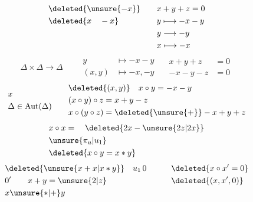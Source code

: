\[
\begin{aligned}
 &\deleted{\unsure{-x}}\quad &&x+y+z=0\\
 &\deleted{x\quad -x}&&y\longmapsto-x-y\\
 &&&y\longrightarrow-y\\
 &&&x\longmapsto-x
\end{aligned}
\]
\[
 \Delta\times \Delta\longrightarrow \Delta\qquad
 \begin{aligned}
 y&\longmapsto-x-y\\
 (x,y)&\longmapsto-x,-y
 \end{aligned}\quad
 \begin{aligned}
 x+y+z&=0\\
 -x-y-z&=0
 \end{aligned}
\]
\[
\begin{aligned}
 &x\\
 &\Delta\in\operatorname{Aut}(\Delta)
\end{aligned}\qquad
\begin{aligned}
 &\deleted{(x,y)}\quad x\circ y=-x-y\\
 &(x\circ y)\circ z=x+y-z\\
 &x\circ(y\circ z)=\deleted{\unsure{+}}-x+y+z
\end{aligned}
\]
\[
\begin{aligned}
 &x\circ x=\quad\deleted{2x- \unsure{2z|2x}}\\
 &\unsure{\pi_{u}|u_1}\\
 &\deleted{x\circ y=x*y}
\end{aligned}
\]
\[
\begin{aligned}
 &\deleted{\unsure{x+x|x*y}}\quad u_1\,0\qquad &&\deleted{x\circ x'=0}\\
 &0'\qquad x+y=\unsure{2|z}&&\deleted{(x,x',0)}\\
 &x\unsure{*|+}y
\end{aligned}
\]
